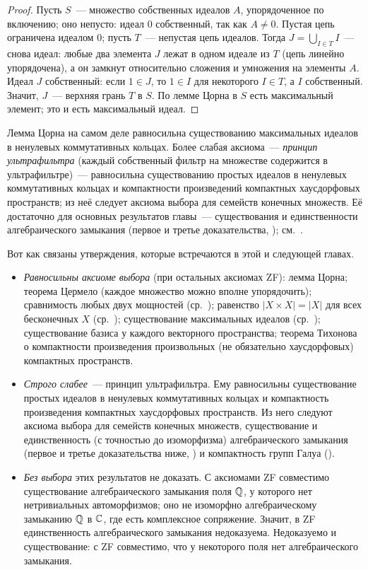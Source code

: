 \begin{proof}
Пусть $S$~--- множество собственных идеалов $A$, упорядоченное по включению; оно непусто: идеал $0$ собственный, так как
$A\ne0$. Пустая цепь ограничена идеалом $0$; пусть $T$~--- непустая цепь идеалов. Тогда $J=\bigcup_{I\in T}I$~--- снова идеал: любые два элемента $J$ лежат в одном идеале из $T$
(цепь линейно упорядочена), а он замкнут относительно сложения и умножения на элементы $A$. Идеал $J$ собственный:
если $1\in J$, то $1\in I$ для некоторого $I\in T$, а $I$ собственный. Значит, $J$~--- верхняя грань $T$ в $S$. По лемме Цорна в $S$ есть максимальный элемент; это и есть
максимальный идеал.
\end{proof}

\begin{remark}[6.4]
Лемма Цорна на самом деле равносильна существованию максимальных идеалов в ненулевых коммутативных кольцах. Более
слабая аксиома~--- \emph{принцип ультрафильтра} (каждый собственный фильтр на множестве содержится в
ультрафильтре)~--- равносильна
существованию простых идеалов в ненулевых коммутативных кольцах и компактности произведений компактных хаусдорфовых
пространств; из неё следует аксиома выбора для семейств конечных множеств. Её достаточно для основных результатов
главы~--- существования и единственности алгебраического замыкания (первое и третье доказательства, ); см.~.
\end{remark}

\begin{aside}
Вот как связаны утверждения, которые встречаются в этой и следующей главах.
\begin{itemize}[leftmargin=*]
\item \emph{Равносильны аксиоме выбора} (при остальных аксиомах ZF): лемма Цорна; теорема Цермело (каждое множество
можно вполне упорядочить); сравнимость любых двух мощностей (ср.~); равенство $|X\times X|=|X|$ для всех
бесконечных $X$ (ср.~); существование максимальных идеалов (ср.~); существование базиса у каждого векторного
пространства; теорема Тихонова о компактности произведения произвольных (не обязательно хаусдорфовых) компактных
пространств.
\item \emph{Строго слабее}~--- принцип ультрафильтра. Ему равносильны существование простых идеалов в ненулевых
коммутативных кольцах и компактность произведения компактных хаусдорфовых пространств. Из него следуют аксиома выбора
для семейств конечных множеств, существование и единственность (с точностью до изоморфизма) алгебраического замыкания
(первое и третье доказательства ниже, ) и компактность групп Галуа ().
\item \emph{Без выбора} этих результатов не доказать. С аксиомами ZF совместимо существование алгебраического замыкания
поля $\mathbb Q$, у которого нет нетривиальных автоморфизмов; оно не изоморфно алгебраическому замыканию $\mathbb Q$ в $\mathbb C$, где есть
комплексное сопряжение. Значит, в ZF единственность алгебраического замыкания недоказуема. Недоказуемо и
существование: с ZF совместимо, что у некоторого поля нет алгебраического замыкания.
\end{itemize}
\end{aside}
